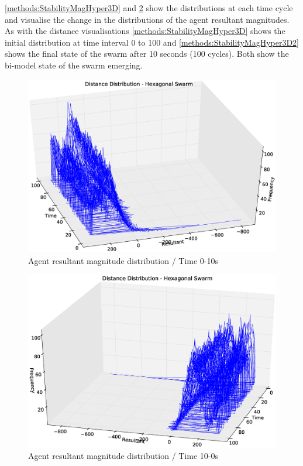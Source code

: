 \autoref{methods:StabilityMagHyper3D} and \ref{methods:StabilityMagHyper3D2} show the distributions at each time cycle and visualise the change in the distributions of the agent resultant magnitudes. As with the distance visualisations \autoref{methods:StabilityMagHyper3D} shows the initial distribution at time interval 0 to 100 and \autoref{methods:StabilityMagHyper3D2} shows the final state of the swarm after 10 seconds (100 cycles). Both show the bi-model state of the swarm emerging.
\begin{figure}[H]
\begin{center}
\includegraphics[width=13cm]{CHAPTER-5/figures/StabilityMagHyper3D}
\end{center}
\caption{Agent resultant magnitude distribution / Time 0-10s\label{methods:StabilityMagHyper3D}}
\end{figure}

\begin{figure}[H]
\begin{center}
\includegraphics[width=13cm]{CHAPTER-5/figures/StabilityMagHyper3D2}
\end{center}
\caption{Agent resultant magnitude distribution / Time 10-0s\label{methods:StabilityMagHyper3D2}}
\end{figure}

